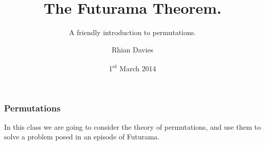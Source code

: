 \documentclass{beamer}
\begin{document}
\title{The Futurama Theorem.}
\subtitle{A friendly introduction to permutations.}
\author{Rhian Davies}
\date{1\textsuperscript{st} March 2014}

\begin{frame}[plain] 
  \titlepage
\end{frame}

\begin{frame}
  \frametitle{Permutations}
In this class we are going to consider the theory of permutations, and use them to solve a problem posed in an episode of Futurama. 


\end{frame}



    





\end{document}
